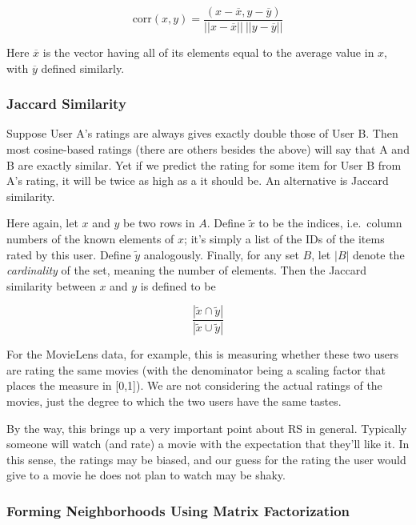 \begin{equation}
\textrm{corr}(x,y) =
\frac{(x-\overline{x},y-\overline{y})}
{||x-\overline{x}|| ~ ||y-\overline{y}||}
\end{equation}

Here $\overline{x}$ is the vector having all of its elements equal to
the average value in $x$, with $\overline{y}$ defined similarly.

\subsubsection{Jaccard Similarity}

Suppose User A's ratings are always gives exactly double those of User
B.  Then most cosine-based ratings (there are others besides the
above) will say that A and B are exactly similar.  Yet if we predict the
rating for some item for User B from A's rating, it will be twice as
high as a it should be.  An alternative is Jaccard similarity.

Here again, let $x$ and $y$ be two rows in $A$.  Define
$\widetilde{x}$ to be the indices, i.e.\ column numbers of the known
elements of $x$; it's simply a list of the IDs of the items rated by
this user.  Define $\widetilde{y}$ analogously.  Finally, for any set
$B$, let $|B|$ denote the \textit{cardinality} of the set, meaning the
number of elements.  Then the Jaccard similarity between $x$ and $y$ is
defined to be

\begin{equation}
\frac{|\widetilde{x} \cap \widetilde{y}|}
{|\widetilde{x} \cup \widetilde{y}|}
\end{equation}

For the MovieLens data, for example, this is measuring whether these two
users are rating the same movies (with the denominator being a scaling
factor that places the measure in [0,1]).  We are not considering the
actual ratings of the movies, just the degree to which the two users
have the same tastes.

By the way, this brings up a very important point about RS in general.
Typically someone will watch (and rate) a movie with the expectation
that they'll like it.  In this sense, the ratings may be biased, and our
guess for the rating the user would give to a movie he does not plan to
watch may be shaky. 

\subsubsection{Forming Neighborhoods Using Matrix Factorization}

